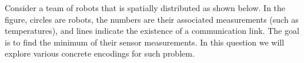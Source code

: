 

Consider a team of robots that is spatially distributed as shown below.
In the figure, circles are robots, the numbers are their associated measurements (such as temperatures), and lines indicate the existence of a communication link.
The goal is to find the minimum of their sensor measurements.
In this question we will explore various concrete encodings for such problem.

\begin{center}
  \end{center}

